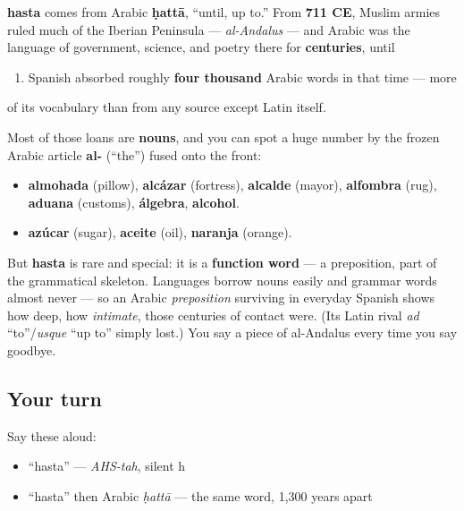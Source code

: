 \begin{cousinweb}
\textbf{hasta} comes from Arabic \textbf{ḥattā}, “until, up to.” From \textbf{711 CE}, Muslim armies ruled much of the Iberian Peninsula — \emph{al-Andalus} — and Arabic was the language of government, science, and poetry there for \textbf{centuries}, until

\begin{enumerate}
\raggedright
  \item Spanish absorbed roughly \textbf{four thousand} Arabic words in that time — more
\end{enumerate}

of its vocabulary than from any source except Latin itself.

Most of those loans are \textbf{nouns}, and you can spot a huge number by the frozen Arabic article \textbf{al-} (\textquotedblleft{}the\textquotedblright{}) fused onto the front:

\begin{itemize}
\raggedright
  \item \textbf{almohada} (pillow), \textbf{alcázar} (fortress), \textbf{alcalde} (mayor), \textbf{alfombra} (rug), \textbf{aduana} (customs), \textbf{álgebra}, \textbf{alcohol}.
  \item \textbf{azúcar} (sugar), \textbf{aceite} (oil), \textbf{naranja} (orange).
\end{itemize}

But \textbf{hasta} is rare and special: it is a \textbf{function word} — a preposition, part of the grammatical skeleton. Languages borrow nouns easily and grammar words almost never — so an Arabic \emph{preposition} surviving in everyday Spanish shows how deep, how \emph{intimate}, those centuries of contact were. (Its Latin rival \emph{ad} \textquotedblleft{}to\textquotedblright{}/\emph{usque} \textquotedblleft{}up to\textquotedblright{} simply lost.) You say a piece of al-Andalus every time you say goodbye.
\end{cousinweb}

\subsection*{Your turn}
Say these aloud:

\begin{itemize}
\raggedright
  \item \textquotedblleft{}hasta\textquotedblright{} — \emph{AHS-tah}, silent h
  \item \textquotedblleft{}hasta\textquotedblright{} then Arabic \emph{ḥattā} — the same word, 1,300 years apart
\end{itemize}

